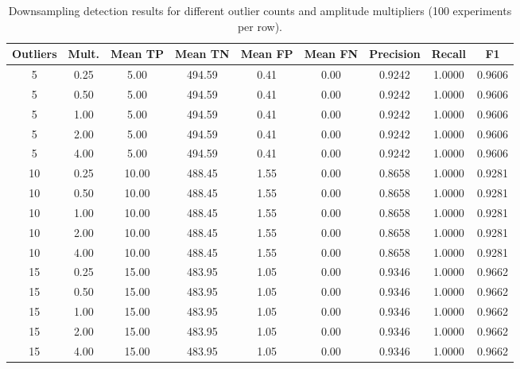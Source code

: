 \documentclass[journal]{IEEEtran}
\begin{document}
\begin{table}[t]
\centering
\caption{Downsampling detection results for different outlier counts and amplitude multipliers (100 experiments per row).}
\label{tab:down}
\scriptsize
\setlength{\tabcolsep}{4.0pt}
\begin{tabular}{ccccccccc}
\toprule
Outliers & Mult. & Mean TP & Mean TN & Mean FP & Mean FN & Precision & Recall & F1\\
\midrule
5&0.25&5.00&494.59&0.41&0.00&0.9242&1.0000&0.9606\\
5&0.50&5.00&494.59&0.41&0.00&0.9242&1.0000&0.9606\\
5&1.00&5.00&494.59&0.41&0.00&0.9242&1.0000&0.9606\\
5&2.00&5.00&494.59&0.41&0.00&0.9242&1.0000&0.9606\\
5&4.00&5.00&494.59&0.41&0.00&0.9242&1.0000&0.9606\\
10&0.25&10.00&488.45&1.55&0.00&0.8658&1.0000&0.9281\\
10&0.50&10.00&488.45&1.55&0.00&0.8658&1.0000&0.9281\\
10&1.00&10.00&488.45&1.55&0.00&0.8658&1.0000&0.9281\\
10&2.00&10.00&488.45&1.55&0.00&0.8658&1.0000&0.9281\\
10&4.00&10.00&488.45&1.55&0.00&0.8658&1.0000&0.9281\\
15&0.25&15.00&483.95&1.05&0.00&0.9346&1.0000&0.9662\\
15&0.50&15.00&483.95&1.05&0.00&0.9346&1.0000&0.9662\\
15&1.00&15.00&483.95&1.05&0.00&0.9346&1.0000&0.9662\\
15&2.00&15.00&483.95&1.05&0.00&0.9346&1.0000&0.9662\\
15&4.00&15.00&483.95&1.05&0.00&0.9346&1.0000&0.9662\\
\bottomrule
\end{tabular}
\end{table}
\end{document}
